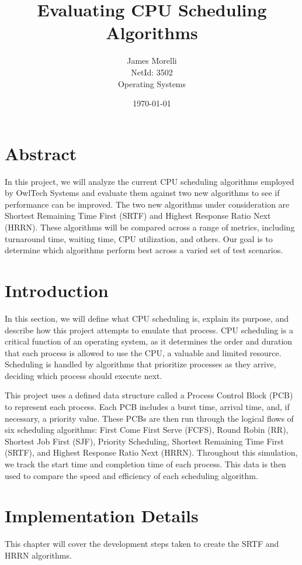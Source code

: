 \documentclass[conference]{report}
\begin{document}
\title{Evaluating  CPU Scheduling Algorithms}
\author{James Morelli \\ \small NetId: 3502 \\ \small Operating Systems}
\date{\today}

\maketitle
\chapter*{Abstract}
In this project, we will analyze the current CPU scheduling algorithms employed by OwlTech Systems and evaluate them against two new algorithms to see if performance can be improved. The two new algorithms under consideration are Shortest Remaining Time First (SRTF) and Highest Response Ratio Next (HRRN). These algorithms will be compared across a range of metrics, including turnaround time, waiting time, CPU utilization, and others. Our goal is to determine which algorithms perform best across a varied set of test scenarios.
\tableofcontents

\chapter{Introduction}
In this section, we will define what CPU scheduling is, explain its purpose, and describe how this project attempts to emulate that process. CPU scheduling is a critical function of an operating system, as it determines the order and duration that each process is allowed to use the CPU, a valuable and limited resource. Scheduling is handled by algorithms that prioritize processes as they arrive, deciding which process should execute next.

This project uses a defined data structure called a Process Control Block (PCB) to represent each process. Each PCB includes a burst time, arrival time, and, if necessary, a priority value. These PCBs are then run through the logical flows of six scheduling algorithms: First Come First Serve (FCFS), Round Robin (RR), Shortest Job First (SJF), Priority Scheduling, Shortest Remaining Time First (SRTF), and Highest Response Ratio Next (HRRN). Throughout this simulation, we track the start time and completion time of each process. This data is then used to compare the speed and efficiency of each scheduling algorithm.

\chapter{Implementation Details}
This chapter will cover the development steps taken to create the SRTF and HRRN algorithms.
\end{document}
